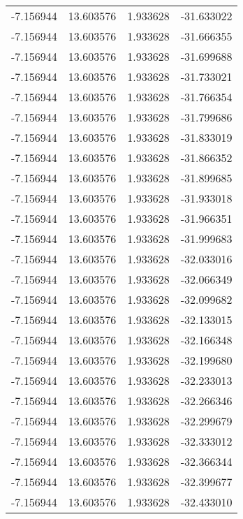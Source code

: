\begin{tabular}{rrrr}
       -7.156944 &        13.603576 &    1.933628 & -31.633022 \\
       -7.156944 &        13.603576 &    1.933628 & -31.666355 \\
       -7.156944 &        13.603576 &    1.933628 & -31.699688 \\
       -7.156944 &        13.603576 &    1.933628 & -31.733021 \\
       -7.156944 &        13.603576 &    1.933628 & -31.766354 \\
       -7.156944 &        13.603576 &    1.933628 & -31.799686 \\
       -7.156944 &        13.603576 &    1.933628 & -31.833019 \\
       -7.156944 &        13.603576 &    1.933628 & -31.866352 \\
       -7.156944 &        13.603576 &    1.933628 & -31.899685 \\
       -7.156944 &        13.603576 &    1.933628 & -31.933018 \\
       -7.156944 &        13.603576 &    1.933628 & -31.966351 \\
       -7.156944 &        13.603576 &    1.933628 & -31.999683 \\
       -7.156944 &        13.603576 &    1.933628 & -32.033016 \\
       -7.156944 &        13.603576 &    1.933628 & -32.066349 \\
       -7.156944 &        13.603576 &    1.933628 & -32.099682 \\
       -7.156944 &        13.603576 &    1.933628 & -32.133015 \\
       -7.156944 &        13.603576 &    1.933628 & -32.166348 \\
       -7.156944 &        13.603576 &    1.933628 & -32.199680 \\
       -7.156944 &        13.603576 &    1.933628 & -32.233013 \\
       -7.156944 &        13.603576 &    1.933628 & -32.266346 \\
       -7.156944 &        13.603576 &    1.933628 & -32.299679 \\
       -7.156944 &        13.603576 &    1.933628 & -32.333012 \\
       -7.156944 &        13.603576 &    1.933628 & -32.366344 \\
       -7.156944 &        13.603576 &    1.933628 & -32.399677 \\
       -7.156944 &        13.603576 &    1.933628 & -32.433010 \\

\end{tabular}
